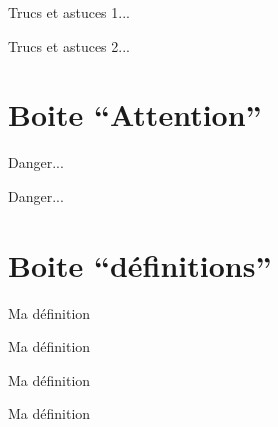 \documentclass[a4paper,12pt]{article}
\begin{document}
\begin{astuces*}
	\item Trucs et astuces 1...
	\item Trucs et astuces 2...
\end{astuces*}%










	\section{Boite ``Attention''}

\begin{code}%
\begin{attention}
	Danger...
\end{attention}
\end{code}

\begin{attention}
	Danger...
\end{attention}%




	\section{Boite ``définitions''}


\begin{code}%
\begin{definition}
	Ma définition
\end{definition}
\end{code}

\begin{definition}
	Ma définition
\end{definition}%


\begin{code}%
\begin{definition*}
	Ma définition
\end{definition*}
\end{code}

\begin{definition*}
	Ma définition
\end{definition*}%
\end{document}
